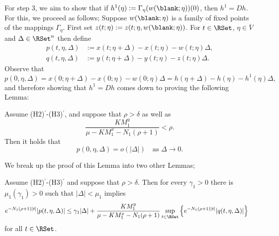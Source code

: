 \documentclass[a4paper]{siamart190516}
\begin{document}
For step 3, we aim to show that if $h^1(\eta) := \Gamma_{\eta}(w(\blank; \eta))(0)$, then $h^1 = D h$. For this, we proceed as follows; Suppose $w(\blank; \eta)$ is a family of fixed points of the mappings $\Gamma_{\eta}$. First set $z(t;\eta):= z(t; \eta, w(\blank; \eta))$. For $t \in \RSet$, $\eta \in \overline{V}$ and $\Delta \in \RSet^n$ then define
 \begin{align*}
  p(t, \eta, \Delta) &:= x(t; \eta+\Delta) - x(t; \eta) - w(t;\eta) \Delta, \\
  q(t,\eta,\Delta) &:= y(t; \eta+\Delta) - y(t; \eta) - z(t; \eta) \Delta.
 \end{align*}
 Observe that
\[
 p(0,\eta,\Delta) = x(0; \eta + \Delta) - x(0; \eta) - w(0; \eta) \Delta = h( \eta + \Delta) - h(\eta) - h^1(\eta) \Delta,
\]
 and therefore showing that $h^1 = D h$ comes down to proving the following Lemma:
  \begin{lemma}\label{lem:p-o-delta}
     Assume (H2)$^\prime$-(H3)$^\prime$, and suppose that $\rho > \delta$ as well as
     \[
     \frac{K M^y_1}{\mu-K M^x_1-N_1 (\rho+1)} < \rho.
     \] 
    Then it holds that 
  \[
  p(0,\eta,\Delta) = o(|\Delta|) \quad \text{as $\Delta \rightarrow 0$}.
  \]
  \end{lemma}
  
  We break up the proof of this Lemma into two other Lemmas;
  
  \begin{lemma}\label{lem:p-bound}
    Assume (H2)$^\prime$-(H3)$^\prime$ and suppose that $\rho > \delta$. Then for every $\gamma_1 > 0$ there is $\mu_1(\gamma_1) > 0$ such that $|\Delta| < \mu_1$ implies
   \begin{align*}
 e^{-N_1(\rho + 1) |t|} |p(t,\eta,\Delta)| &\leq \gamma_1 |\Delta|  + \frac{K M^y_1}{\mu-K M^x_1-N_1(\rho+1)} \sup_{t \in \RSet} \left\{ e^{-N_1(\rho+1) |t|}|q(t,\eta,\Delta)| \right\}
\end{align*}
   for all $t \in \RSet$.
  \end{lemma}
 
\end{document}
